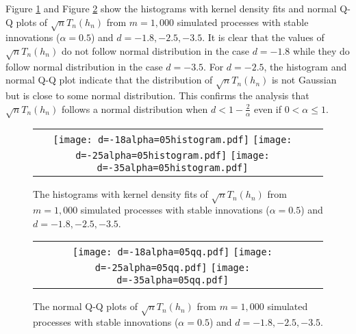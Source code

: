 \documentclass[11pt]{article}
\begin{document}
Figure \ref{fig:5} and Figure \ref{fig:6} show the histograms with kernel density fits and normal Q-Q plots of $\sqrt{n}T_n(h_n)$ from $m=1,000$ simulated processes with stable innovations ($\alpha=0.5$) and $d=-1.8,-2.5, -3.5$.  It is clear that the values of $\sqrt{n}T_n(h_n)$ do not follow normal distribution in the case $d=-1.8$ while they do follow normal distribution in the case $d=-3.5$. For $d=-2.5$, the histogram and normal Q-Q plot indicate that the distribution of $\sqrt{n}T_n(h_n)$ is not Gaussian but is close to some normal distribution. This confirms the analysis that  $\sqrt{n}T_n(h_n)$ follows a normal distribution when $d<1-\frac{2}{\alpha}$ even if $0<\alpha\le 1$.
\begin{figure}[H]
\centering
\begin{tabular}{cc}
\texttt{[image: d=-18alpha=05histogram.pdf]}
\texttt{[image: d=-25alpha=05histogram.pdf]}
\texttt{[image: d=-35alpha=05histogram.pdf]}
\end{tabular}
\caption {The histograms with kernel density fits of $\sqrt{n}T_n(h_n)$ from $m=1,000$ simulated processes with stable innovations ($\alpha=0.5$)  and $d=-1.8, -2.5, -3.5$.\label{fig:5}}
\end{figure}
\begin{figure}[H]
\centering
\begin{tabular}{cc}
\texttt{[image: d=-18alpha=05qq.pdf]}
\texttt{[image: d=-25alpha=05qq.pdf]}
\texttt{[image: d=-35alpha=05qq.pdf]}
\end{tabular}
\caption {The normal Q-Q plots of $\sqrt{n}T_n(h_n)$ from $m=1,000$ simulated processes with stable innovations ($\alpha=0.5$)  and $d=-1.8, -2.5, -3.5$. \label{fig:6}}
\end{figure}
\end{document}

